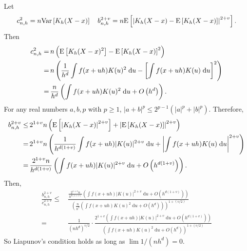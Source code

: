 Let
\begin{equation*}
  c_{n, h}^{2} = n \mathrm{Var} \left[ K_{h} (X - x) \right] \quad b_{n, h}^{2 + v} = n
  \mathrm{E} \left[ \left| K_{h} (X - x) - \mathrm{E} \left[ K_{h} (X - x) \right] \right|^{2 +
  v} \right].
\end{equation*}
Then
\begin{align*}
  c_{n, h}^{2} =
  & \, n \left( \mathrm{E} \left[ K_{h} (X - x)^{2} \right] - \mathrm{E} \left[ K_{h} (X - x)
  \right]^{2} \right) \\
  =
  & \, n \left( \frac{1}{h^{d}} \int f (x + u h) K (u)^{2} \; \mathrm{d} u -
  \left[ \int f (x + u h) K (u) \; \mathrm{d} u \right]^{2} \right) \\
  =
  & \, \frac{n}{h^{d}} \left( \int f (x + u h) K (u)^{2} \; \mathrm{d} u + O
  \left( h^{d} \right) \right).
\end{align*}
For any real numbers \(a, b, p\) with \(p \geq 1\), \(|a + b|^{p} \leq 2^{p - 1}
\left( |a|^{p} + |b|^{p} \right)\).
Therefore,
\begin{align*}
  b_{n, h}^{2 + v} \leq
  & \, 2^{1 + v} n \left( \mathrm{E} \left[ \left| K_{h} (X - x) \right|^{2 + v} \right]
  + \left| \mathrm{E} \left[ K_{h} (X - x) \right] \right|^{2 + v} \right) \\
  =
  & \, 2^{1 + v} n \left( \frac{1}{h^{d (1 + v)}} \int f (x + u h) |K (u)|^{2 +
  v} \; \mathrm{d} u + \left| \int f (x + u h) K (u) \; \mathrm{d} u \right|^{2
  + v} \right) \\
  =
  & \, \frac{2^{1 + v} n}{h^{d (1 + v)}} \left( \int f (x + u h) |K (u)|^{2 + v}
  \; \mathrm{d} u + O \left( h^{d (1 + v)} \right) \right).
\end{align*}
Then,
\begin{align*}
  \frac{b_{n, h}^{2 + v}}{c_{n, h}^{2 + v}} \leq
  & \, \frac{\frac{2^{1 + v} n}{h^{d (1 + v)}} \left( \int f (x + u h) |K
  (u)|^{2 + v} \; \mathrm{d} u + O \left( h^{d (1 + v)} \right) \right)}{\left(
  \frac{n}{h^{d}} \left( \int f (x + u h) K (u)^{2} \; \mathrm{d} u + O \left(
  h^{d} \right) \right) \right)^{1 + (v / 2)}} \\
  =
  & \, \frac{1}{\left( n h^{d} \right)^{v / 2}} \cdot \frac{2^{1 + v} \left(
  \int f (x + u h) |K (u)|^{2 + v} \; \mathrm{d} u + O \left( h^{d (1 + v)}
  \right) \right)}{\left( \int f (x + u h) K (u)^{2} \; \mathrm{d} u + O \left(
  h^{d} \right) \right)^{1 + (v / 2)}}
\end{align*}
So Liapunov's condition holds as long as \(\lim 1 / \left( n h^{d} \right) =
0\).

